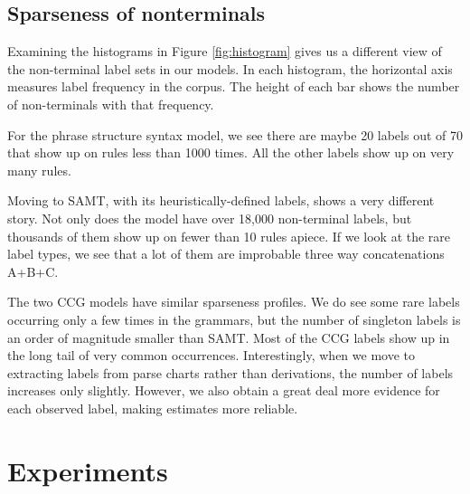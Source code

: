 \documentclass[a4paper]{article}
\begin{document}



\subsection{Sparseness of nonterminals}

Examining the histograms in Figure \ref{fig:histogram} gives us a different view of the non-terminal label sets in our models. In each histogram, the horizontal axis measures label frequency in the corpus. The height of each bar shows the number of non-terminals with that frequency. %

For the phrase structure syntax model, we see there are maybe 20 labels out of 70 that show up on rules less than 1000 times. All the other labels show up on very many rules.

Moving to SAMT, with its heuristically-defined labels, shows a very different story. Not only does the model have over 18,000 non-terminal labels, but thousands of them show up on fewer than 10 rules apiece. If we look at the rare label types, we see that a lot of them are improbable three way concatenations A+B+C. 

The two CCG models have similar sparseness profiles. We do see some rare labels occurring only a few times in the grammars, but the number of singleton labels is an order of magnitude smaller than SAMT. Most of the CCG labels show up in the long tail of very common occurrences. Interestingly, when we move to extracting labels from parse charts rather than derivations, the number of labels increases only slightly. However, we also obtain a great deal more evidence for each observed label, making estimates more reliable.

\section{Experiments}
\end{document}
